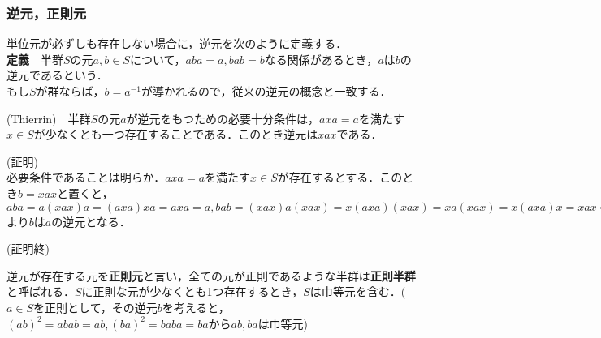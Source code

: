 \documentclass{jsarticle}
\begin{document}
\subsubsection{逆元，正則元}
単位元が必ずしも存在しない場合に，逆元を次のように定義する．\\
{\bf 定義}　半群$S$の元$a,b\in S$について，$aba=a,bab=b$なる関係があるとき，$a$は$b$の逆元であるという．\\
もし$S$が群ならば，$b=a^{-1}$が導かれるので，従来の逆元の概念と一致する．
\begin{prop}
(Thierrin)　半群$S$の元$a$が逆元をもつための必要十分条件は，$axa=a$を満たす$x\in S$が少なくとも一つ存在することである．このとき逆元は$xax$である．
\end{prop}
(証明)\\
必要条件であることは明らか．$axa=a$を満たす$x\in S$が存在するとする．このとき$b=xax$と置くと，$aba=a(xax)a=(axa)xa=axa=a, bab=(xax)a(xax)=x(axa)(xax)=xa(xax)=x(axa)x=xax=b$より$b$は$a$の逆元となる．
\begin{flushright}
(証明終)
\end{flushright}
逆元が存在する元を{\bf 正則元}と言い，全ての元が正則であるような半群は{\bf 正則半群}と呼ばれる．$S$に正則な元が少なくとも1つ存在するとき，$S$は巾等元を含む．($a\in S$を正則として，その逆元$b$を考えると，$(ab)^2=abab=ab, (ba)^2=baba=ba$から$ab,ba$は巾等元)
\end{document}

